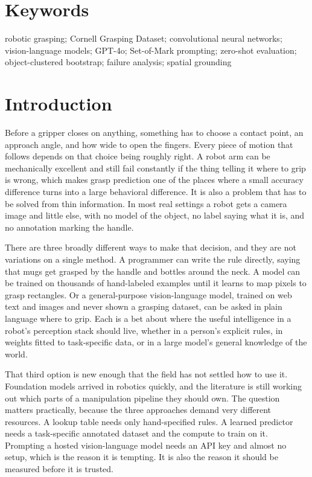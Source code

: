 \documentclass[12pt,letterpaper]{article}
\begin{document}
\section*{Keywords}
robotic grasping; Cornell Grasping Dataset; convolutional neural networks;
vision-language models; GPT-4o; Set-of-Mark prompting; zero-shot evaluation;
object-clustered bootstrap; failure analysis; spatial grounding

\section{Introduction}

Before a gripper closes on anything, something has to choose a contact
point, an approach angle, and how wide to open the fingers. Every piece
of motion that follows depends on that choice being roughly right. A
robot arm can be mechanically excellent and still fail constantly if
the thing telling it where to grip is wrong, which makes grasp
prediction one of the places where a small accuracy difference turns
into a large behavioral difference. It is also a problem that has to be
solved from thin information. In most real settings a robot gets a
camera image and little else, with no model of the object, no label
saying what it is, and no annotation marking the handle.

There are three broadly different ways to make that decision, and they
are not variations on a single method. A programmer can write the rule
directly, saying that mugs get grasped by the handle and bottles around
the neck. A model can be trained on thousands of hand-labeled examples
until it learns to map pixels to grasp rectangles. Or a general-purpose
vision-language model, trained on web text and images and never shown a
grasping dataset, can be asked in plain language where to grip.
Each is a bet about where the useful intelligence in a robot's
perception stack should live, whether in a person's explicit rules, in
weights fitted to task-specific data, or in a large model's general
knowledge of the world.

That third option is new enough that the field has not settled how to
use it. Foundation models arrived in robotics quickly, and the
literature is still working out which parts of a manipulation pipeline
they should own. The question matters practically, because the three
approaches demand very different resources. A lookup table needs only
hand-specified rules. A learned predictor needs a task-specific
annotated dataset and the compute to train on it. Prompting a hosted
vision-language model needs an API key and almost no setup, which is
the reason it is tempting. It is also the reason it should be measured
before it is trusted.
\end{document}
